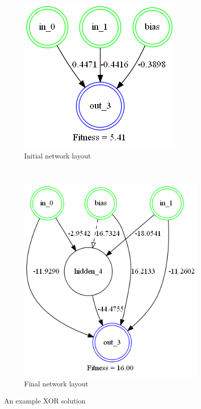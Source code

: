 \documentclass[letterpaper]{article}
\begin{document}
\begin{figure}[h!]
	\centering
	\begin{subfigure}[b]{0.3\textwidth}
		\includegraphics[width=\textwidth]{images/xor_start.png}
		\caption{Initial network layout}
	\end{subfigure}
	~
	\begin{subfigure}[b]{0.3\textwidth}
		\includegraphics[width=\textwidth]{images/xor_end.png}
		\caption{Final network layout}
	\end{subfigure}
	\caption{An example XOR solution}
	\label{fig:xor}
\end{figure}
 
\end{document}
